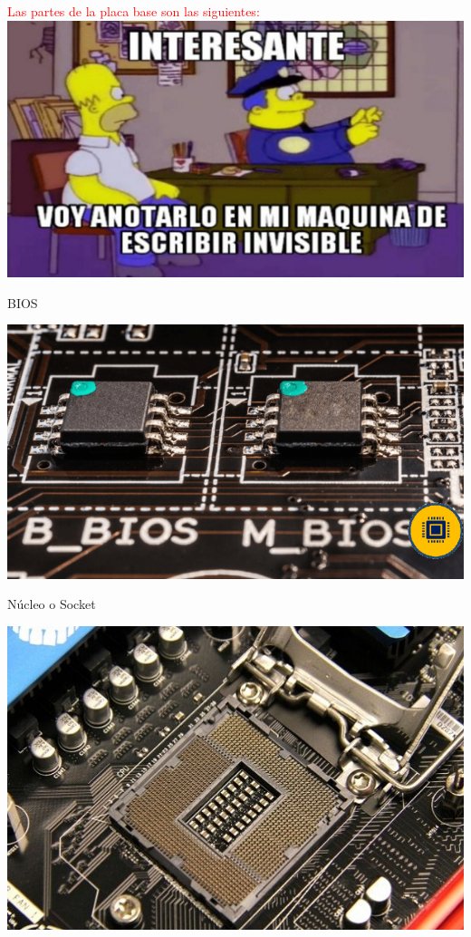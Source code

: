 \documentclass[10pt,xcolor={dvipsnames}]{beamer}
\begin{document}
\begin{frame}
\begin{center}
\Large{\textcolor{red}{Las partes de la placa base son las siguientes:}} \\ \pause
\includegraphics[scale=0.2]{Figures/imaginario}
\end{center}
\end{frame}

\begin{frame}{BIOS}
\begin{center}
\includegraphics[scale=0.5]{Figures/BIOS}
\end{center}
\end{frame}

\begin{frame}{Núcleo o Socket}
\begin{center}
\includegraphics[scale=0.5]{Figures/Socket}
\end{center}
\end{frame}
\end{document}
